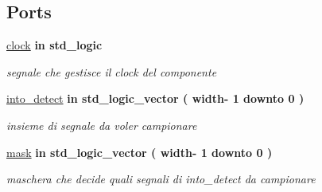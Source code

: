 \subsection*{Ports}
 \begin{DoxyCompactItemize}
\item 
\mbox{\label{classDetector_a70b0b3771fd176cebd9a42a231576bb9}} 
\hyperlink{classDetector_a70b0b3771fd176cebd9a42a231576bb9}{clock}  {\bfseries {\bfseries \textcolor{vhdlchar}{in}\textcolor{vhdlchar}{ }}} {\bfseries \textcolor{vhdlchar}{std\+\_\+logic}\textcolor{vhdlchar}{ }} 
\begin{DoxyCompactList}\small\item\em segnale che gestisce il clock del componente \end{DoxyCompactList}\item 
\mbox{\label{classDetector_a9025737de937757419a20a9639bd69a7}} 
\hyperlink{classDetector_a9025737de937757419a20a9639bd69a7}{into\+\_\+detect}  {\bfseries {\bfseries \textcolor{vhdlchar}{in}\textcolor{vhdlchar}{ }}} {\bfseries \textcolor{vhdlchar}{std\+\_\+logic\+\_\+vector}\textcolor{vhdlchar}{ }\textcolor{vhdlchar}{(}\textcolor{vhdlchar}{ }\textcolor{vhdlchar}{ }\textcolor{vhdlchar}{width}\textcolor{vhdlchar}{-\/}\textcolor{vhdlchar}{ } \textcolor{vhdldigit}{1} \textcolor{vhdlchar}{ }\textcolor{vhdlchar}{downto}\textcolor{vhdlchar}{ } \textcolor{vhdldigit}{0} \textcolor{vhdlchar}{ }\textcolor{vhdlchar}{)}\textcolor{vhdlchar}{ }} 
\begin{DoxyCompactList}\small\item\em insieme di segnale da voler campionare \end{DoxyCompactList}\item 
\mbox{\label{classDetector_a48367ab8da6692b747c5ebcd065376c2}} 
\hyperlink{classDetector_a48367ab8da6692b747c5ebcd065376c2}{mask}  {\bfseries {\bfseries \textcolor{vhdlchar}{in}\textcolor{vhdlchar}{ }}} {\bfseries \textcolor{vhdlchar}{std\+\_\+logic\+\_\+vector}\textcolor{vhdlchar}{ }\textcolor{vhdlchar}{(}\textcolor{vhdlchar}{ }\textcolor{vhdlchar}{ }\textcolor{vhdlchar}{width}\textcolor{vhdlchar}{-\/}\textcolor{vhdlchar}{ } \textcolor{vhdldigit}{1} \textcolor{vhdlchar}{ }\textcolor{vhdlchar}{downto}\textcolor{vhdlchar}{ } \textcolor{vhdldigit}{0} \textcolor{vhdlchar}{ }\textcolor{vhdlchar}{)}\textcolor{vhdlchar}{ }} 
\begin{DoxyCompactList}\small\item\em maschera che decide quali segnali di into\+\_\+detect da campionare \end{DoxyCompactList}\item 

\end{DoxyCompactItemize}
